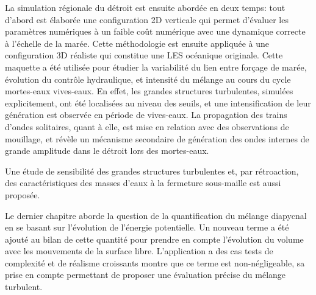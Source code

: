 \documentclass[a4paper,12pt,notitlepage,twoside]{report}
\numberwithin{equation}{section}
\begin{document}
La simulation régionale du détroit est ensuite abordée en deux temps: tout d'abord est élaborée une configuration 2D verticale qui permet d'évaluer les paramètres numériques à un faible coût numérique avec une dynamique correcte à l’échelle de la marée. Cette méthodologie est ensuite appliquée à une configuration 3D réaliste qui constitue une  LES océanique originale. Cette maquette a été utilisée pour étudier la variabilité du lien entre forçage de marée, évolution du contrôle hydraulique, et intensité du mélange au cours du cycle mortes-eaux vives-eaux. En effet, les grandes structures turbulentes, simulées explicitement, ont été localisées au niveau des seuils, et une intensification de leur génération est observée en période de vives-eaux. La propagation des trains d’ondes solitaires, quant à elle, est mise en relation avec des observations de mouillage, et révèle un mécanisme secondaire de génération des ondes internes de grande amplitude dans le détroit lors des mortes-eaux. 

Une étude de sensibilité des grandes structures turbulentes et, par rétroaction, des caractéristiques des masses d’eaux à la fermeture sous-maille est aussi proposée.

Le dernier chapitre aborde la question de la quantification du mélange diapycnal en se basant sur l'évolution de l'énergie potentielle. Un nouveau terme a été ajouté au bilan de cette quantité pour prendre en compte l’évolution du volume avec les mouvements de la surface libre. L’application a des cas tests de complexité et de réalisme croissants montre que ce terme est non-négligeable, sa prise en compte permettant de proposer une évaluation précise du mélange turbulent.
\end{document}
